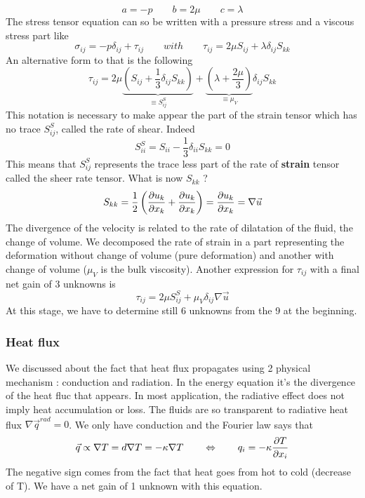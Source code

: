 		\begin{equation}
			a = -p \qquad b = 2\mu \qquad c = \lambda
		\end{equation}
		The stress tensor equation can so be written with a pressure stress and a viscous stress part like 
		\begin{equation}
			\sigma _{ij} = -p\delta _{ij} + \tau _{ij} \qquad with \qquad \tau _{ij} = 2\mu S_{ij} + \lambda \delta _{ij} S_{kk}
			\label{eq:1.58}
		\end{equation}
	  	An alternative form to that is the following 
	  	\begin{equation}
	  		\tau _{ij} = 2 \mu \underbrace{\left( S_{ij} + \frac{1}{3} \delta _{ij} S_{kk} \right)}_{\equiv S_{ij}^S} +\underbrace{\left( \lambda + \frac{2\mu}{3} \right)}_{\equiv \mu _V} \delta _{ij} S_{kk}
	  	\end{equation}
	  	This notation is necessary to make appear the part of the strain tensor which has no trace $S_{ij}^S$, called the rate of shear. Indeed 
	  	\begin{equation}
	  		S_{ii}^S = S_{ii} - \frac{1}{3}\delta _{ii}S_{kk} = 0
	  	\end{equation}
	  	This means that $S_{ij}^S$ represents the trace less part of the rate of \textbf{strain} tensor called the sheer rate tensor. What is now $S_{kk}$ ? 
	  	\begin{equation}
	  		S_{kk} = \frac{1}{2} \left( \frac{\D u_k}{\D x_k} + \frac{\D u_k}{\D x_k} \right) = \frac{\D u_k}{\D x_k} = \nabla \vec{u}
	  	\end{equation}
	  	The divergence of the velocity is related to the rate of dilatation of the fluid, the change of volume. We decomposed the rate of strain in a part representing the deformation without change of volume (pure deformation) and another with change of volume ($\mu _V$ is the bulk viscosity). Another expression for $\tau _{ij}$ with a final net gain of 3 unknowns is 
	  	\begin{equation}
	  		\tau _{ij} = 2 \mu S_{ij}^S + \mu _V \delta _{ij} \nabla \vec{u}
	  		\label{eq:1.62}
		\end{equation}	  	 
		At this stage, we have to determine still 6 unknowns from the 9 at the beginning. 
		
	\subsubsection{Heat flux}
		We discussed about the fact that heat flux propagates using 2 physical mechanism : conduction and radiation. In the energy equation it's the divergence of the heat fluc that appears. In most application, the radiative effect does not imply heat accumulation or loss. The fluids are so transparent to radiative heat flux $\nabla \vec{q}^{rad} =0$. We only have conduction and the Fourier law says that 
		\begin{equation}
			\vec{q} \propto \nabla T = d\nabla T = -\kappa \nabla T \qquad \Leftrightarrow \qquad q_i = -\kappa \frac{\D T}{\D x_i}
		\end{equation}
	The negative sign comes from the fact that heat goes from hot to cold (decrease of T). We have a net gain of 1 unknown with this equation. 
	
